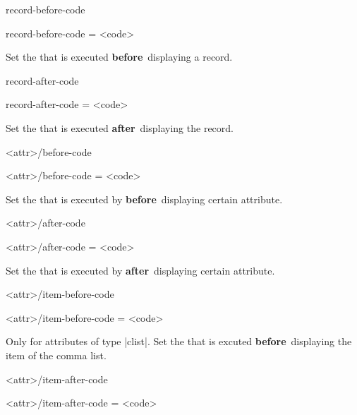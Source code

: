 \documentclass[full]{l3doc}
\def\enbefore{\textbf{before}~}
\def\enafter{\textbf{after}~}
\begin{document}
\begin{documentation}
\begin{option}[added=2022-01-05, rEXP]{record-before-code}
  \begin{syntax}
    record-before-code = <code>
  \end{syntax}

  Set the  that is executed \enbefore displaying a record.
\end{option}

\begin{option}[added=2022-01-05, rEXP]{record-after-code}
  \begin{syntax}
    record-after-code = <code>
  \end{syntax}

  Set the  that is executed \enafter displaying the record.
\end{option}

\begin{option}[added=2022-01-05, rEXP]{<attr>/before-code}
  \begin{syntax}
    <attr>/before-code = <code>
  \end{syntax}

  Set the  that is executed by  \enbefore displaying
  certain attribute.
\end{option}

\begin{option}[added=2022-01-05, rEXP]{<attr>/after-code}
  \begin{syntax}
    <attr>/after-code = <code>
  \end{syntax}

  Set the  that is executed by  \enafter displaying
  certain attribute.
\end{option}

\begin{option}[added=2022-01-05, rEXP]{<attr>/item-before-code}
  \begin{syntax}
    <attr>/item-before-code = <code>
  \end{syntax}

  Only for attributes of type |clist|. Set the  that is excuted
  \enbefore displaying the item of the comma list.
\end{option}

\begin{option}[added=2022-01-05, rEXP]{<attr>/item-after-code}
  \begin{syntax}
    <attr>/item-after-code = <code>
  \end{syntax}


\end{option}
\end{documentation}
\end{document}
